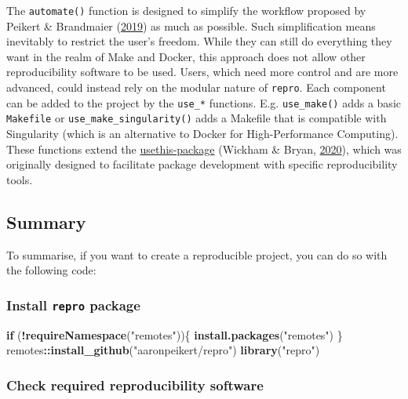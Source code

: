 \documentclass[12pt,a4paper,twoside]{article}
\newenvironment{Shaded}{\begin{snugshade}}{\end{snugshade}}
\newcommand{\ControlFlowTok}[1]{\textcolor[rgb]{0.13,0.29,0.53}{\textbf{#1}}}
\newcommand{\KeywordTok}[1]{\textcolor[rgb]{0.13,0.29,0.53}{\textbf{#1}}}
\newcommand{\NormalTok}[1]{#1}
\newcommand{\OperatorTok}[1]{\textcolor[rgb]{0.81,0.36,0.00}{\textbf{#1}}}
\newcommand{\StringTok}[1]{\textcolor[rgb]{0.31,0.60,0.02}{#1}}
\begin{document}
The \texttt{automate()} function is designed to simplify the workflow proposed by Peikert \& Brandmaier (\protect\hyperlink{ref-peikertReproducibleDataAnalysis2019}{2019}) as much as possible.
Such simplification means inevitably to restrict the user's freedom.
While they can still do everything they want in the realm of Make and Docker, this approach does not allow other reproducibility software to be used.
Users, which need more control and are more advanced, could instead rely on the modular nature of \texttt{repro}.
Each component can be added to the project by the \texttt{use\_*} functions.
E.g. \texttt{use\_make()} adds a basic \texttt{Makefile} or \texttt{use\_make\_singularity()} adds a Makefile that is compatible with Singularity (which is an alternative to Docker for High-Performance Computing).
These functions extend the \href{https://usethis.r-lib.org}{usethis-package} (Wickham \& Bryan, \protect\hyperlink{ref-R-usethis}{2020}), which was originally designed to facilitate package development with specific reproducibility tools.

\hypertarget{summary}{%
\subsection{Summary}\label{summary}}

To summarise, if you want to create a reproducible project, you can do so with the following code:

\hypertarget{install-repro-package}{%
\subsubsection{\texorpdfstring{Install \texttt{repro} package}{Install repro package}}\label{install-repro-package}}

\begin{Shaded}
\begin{Highlighting}[]
\ControlFlowTok{if}\NormalTok{ (}\OperatorTok{!}\KeywordTok{requireNamespace}\NormalTok{(}\StringTok{"remotes"}\NormalTok{))\{}
  \KeywordTok{install.packages}\NormalTok{(}\StringTok{"remotes"}\NormalTok{)}
\NormalTok{\}}
\NormalTok{remotes}\OperatorTok{::}\KeywordTok{install_github}\NormalTok{(}\StringTok{"aaronpeikert/repro"}\NormalTok{)}
\KeywordTok{library}\NormalTok{(}\StringTok{"repro"}\NormalTok{)}
\end{Highlighting}
\end{Shaded}

\hypertarget{check-required-reproducibility-software}{%
\subsubsection{Check required reproducibility software}\label{check-required-reproducibility-software}}
\end{document}
